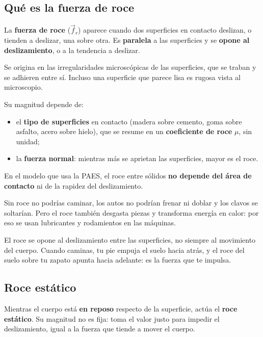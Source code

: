 \subsection{Qué es la fuerza de roce}
La \textbf{fuerza de roce} ($\vec f_r$) aparece cuando dos superficies en contacto deslizan, o tienden a deslizar, una sobre otra. Es \textbf{paralela} a las superficies y se \textbf{opone al deslizamiento}, o a la tendencia a deslizar.

 

Se origina en las irregularidades microscópicas de las superficies, que se traban y se adhieren entre sí. Incluso una superficie que parece lisa es rugosa vista al microscopio.

 

Su magnitud depende de:

 
\begin{itemize}
  \item el \textbf{tipo de superficies} en contacto (madera sobre cemento, goma sobre asfalto, acero sobre hielo), que se resume en un \textbf{coeficiente de roce} $\mu$, sin unidad;
  \item la \textbf{fuerza normal}: mientras más se aprietan las superficies, mayor es el roce.
\end{itemize}
 

En el modelo que usa la PAES, el roce entre sólidos \textbf{no depende del área de contacto} ni de la rapidez del deslizamiento.

  
\begin{clave} Sin roce no podrías caminar, los autos no podrían frenar ni doblar y los clavos se soltarían. Pero el roce también desgasta piezas y transforma energía en calor: por eso se usan lubricantes y rodamientos en las máquinas.\end{clave}
 
\begin{clave}[{Recuerda}] El roce se opone al deslizamiento entre las superficies, no siempre al movimiento del cuerpo. Cuando caminas, tu pie empuja el suelo hacia atrás, y el roce del suelo sobre tu zapato apunta hacia adelante: es la fuerza que te impulsa.\end{clave}
\subsection{Roce estático}
Mientras el cuerpo está \textbf{en reposo} respecto de la superficie, actúa el \textbf{roce estático}. Su magnitud no es fija: toma el valor justo para impedir el deslizamiento, igual a la fuerza que tiende a mover el cuerpo.

